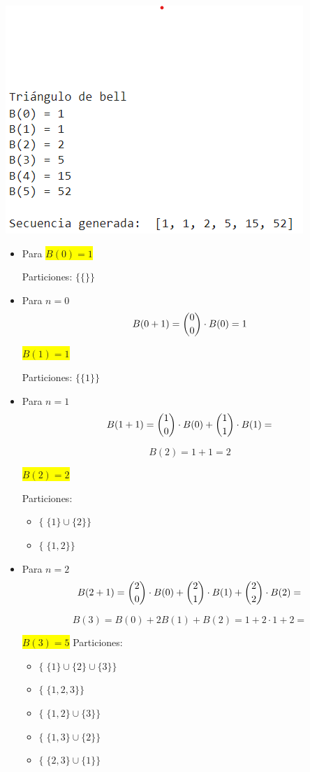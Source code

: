 \begin{enumerate}
    \includegraphics[width=.4\textwidth,height=.4\textwidth]{figures/Secuencia_Num_Bell.png}
    \begin{itemize}
        \item Para \colorbox{yellow}{$B(0)=1$}

        Particiones: $\{ \{\}\}$
        \item Para $n=0$ $$B(0+1)=\dbinom{0}{0}\cdot B(0) =1$$

        \colorbox{yellow}{$B(1)=1$}

        Particiones: $\{ \{1\}\}$
        \item  Para $n=1$ $$B(1+1)=\dbinom{1}{0}\cdot B(0) + \dbinom{1}{1} \cdot B(1)=$$

        $$B(2)= 1+1 = 2$$

        \colorbox{yellow}{$B(2)=2$}

        Particiones: 
            \begin{itemize}
                \item $\{\; \{1\}\cup \{2\} \}$
                \item $\{\; \{1, 2\}\} $
            \end{itemize}
        \item Para $n=2$ $$B(2+1)=\dbinom{2}{0}\cdot B(0) + \dbinom{2}{1} \cdot B(1) + \dbinom{2}{2} \cdot B(2)=$$

        $$B(3)= B(0) + 2B(1) + B(2) = 1 + 2 \cdot 1 + 2 =$$

        \colorbox{yellow}{$B(3)=5$}
        Particiones: 
            \begin{itemize}
                \item $\{\; \{1\}\cup \{2\} \cup \{3\}\}$
                \item $\{\; \{1, 2, 3\}\} $
                \item $\{\; \{1, 2\} \cup \{3\}\}$
                \item $\{\; \{1, 3\} \cup \{2\}\}$
                \item $\{\; \{2, 3\} \cup \{1\}\}$
            \end{itemize}
            

\end{itemize}
\end{enumerate}

